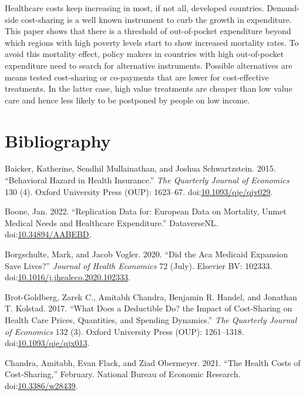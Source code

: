 \documentclass[a4paper,12pt]{article}
\begin{document}
Healthcare costs keep increasing in most, if not all, developed countries. Demand-side cost-sharing is a well known instrument to curb the growth in expenditure. This paper shows that there is a threshold of out-of-pocket expenditure beyond which regions with high poverty levels start to show increased mortality rates. To avoid this mortality effect, policy makers in countries with high out-of-pocket expenditure need to search for alternative instruments. Possible alternatives are means tested cost-sharing or co-payments that are lower for cost-effective treatments. In the latter case, high value treatments are cheaper than low value care and hence less likely to be postponed by people on low income.


\section{Bibliography}
\label{sec:org938cdbf}

\hypertarget{citeproc_bib_item_1}{Baicker, Katherine, Sendhil Mullainathan, and Joshua Schwartzstein. 2015. “Behavioral Hazard in Health Insurance.” \textit{The Quarterly Journal of Economics} 130 (4). Oxford University Press (OUP): 1623–67. doi:\href{https://doi.org/10.1093/qje/qjv029}{10.1093/qje/qjv029}.}

\hypertarget{citeproc_bib_item_2}{Boone, Jan. 2022. “Replication Data for: European Data on Mortality, Unmet Medical Needs and Healthcare Expenditure.” DataverseNL. doi:\href{https://doi.org/10.34894/AABEBD}{10.34894/AABEBD}.}

\hypertarget{citeproc_bib_item_3}{Borgschulte, Mark, and Jacob Vogler. 2020. “Did the Aca Medicaid Expansion Save Lives?” \textit{Journal of Health Economics} 72 (July). Elsevier BV: 102333. doi:\href{https://doi.org/10.1016/j.jhealeco.2020.102333}{10.1016/j.jhealeco.2020.102333}.}

\hypertarget{citeproc_bib_item_4}{Brot-Goldberg, Zarek C., Amitabh Chandra, Benjamin R. Handel, and Jonathan T. Kolstad. 2017. “What Does a Deductible Do? the Impact of Cost-Sharing on Health Care Prices, Quantities, and Spending Dynamics.” \textit{The Quarterly Journal of Economics} 132 (3). Oxford University Press (OUP): 1261–1318. doi:\href{https://doi.org/10.1093/qje/qjx013}{10.1093/qje/qjx013}.}

\hypertarget{citeproc_bib_item_5}{Chandra, Amitabh, Evan Flack, and Ziad Obermeyer. 2021. “The Health Costs of Cost-Sharing,” February. National Bureau of Economic Research. doi:\href{https://doi.org/10.3386/w28439}{10.3386/w28439}.}
\end{document}
